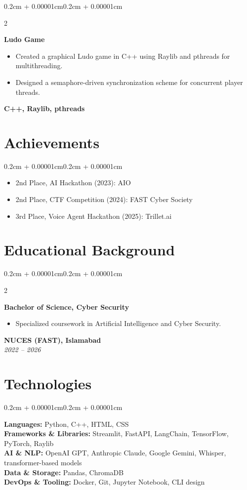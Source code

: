 \documentclass[10pt, letterpaper]{article}
\newenvironment{highlights}{
    \begin{itemize}[
        topsep=0.15cm,
        parsep=0.15cm,
        partopsep=0pt,
        itemsep=0.1cm,
        leftmargin=0.4cm + 10pt
    ]
}{
    \end{itemize}
}
\newenvironment{onecolentry}{
    \begin{adjustwidth}{0.2cm + 0.00001cm}{0.2cm + 0.00001cm}
}{
    \end{adjustwidth}
}
\newenvironment{twocolentry}[2][]{
    \onecolentry
    \def\secondColumn{#2}
    \setcolumnwidth{\fill, 4.5cm}
    \begin{paracol}{2}
}{
    \switchcolumn \raggedleft \secondColumn
    \end{paracol}
    \endonecolentry
}
\begin{document}
\begin{twocolentry}{\textbf{C++, Raylib, pthreads}}
    \textbf{Ludo Game}
    \begin{highlights}
        \item Created a graphical Ludo game in C++ using Raylib and pthreads for multithreading.
        \item Designed a semaphore-driven synchronization scheme for concurrent player threads.
    \end{highlights}
\end{twocolentry}

\section{Achievements}
\begin{onecolentry}
    \begin{highlights}
        \item 2nd Place, AI Hackathon (2023): AIO
        \item 2nd Place, CTF Competition (2024): FAST Cyber Society
        \item 3rd Place, Voice Agent Hackathon (2025): Trillet.ai
    \end{highlights}
\end{onecolentry}

\section{Educational Background}
\begin{twocolentry}{\textbf{NUCES (FAST), Islamabad} \\ \textit{2022 – 2026}}
    \textbf{Bachelor of Science, Cyber Security}
    \begin{highlights}
        \item Specialized coursework in Artificial Intelligence and Cyber Security.
    \end{highlights}
\end{twocolentry}

\section{Technologies}
\begin{onecolentry}
    \textbf{Languages:} Python, C++, HTML, CSS \\
    \textbf{Frameworks \& Libraries:} Streamlit, FastAPI, LangChain, TensorFlow, PyTorch, Raylib \\
    \textbf{AI \& NLP:} OpenAI GPT, Anthropic Claude, Google Gemini, Whisper, transformer-based models \\
    \textbf{Data \& Storage:} Pandas, ChromaDB \\
    \textbf{DevOps \& Tooling:} Docker, Git, Jupyter Notebook, CLI design
\end{onecolentry}
\end{document}
